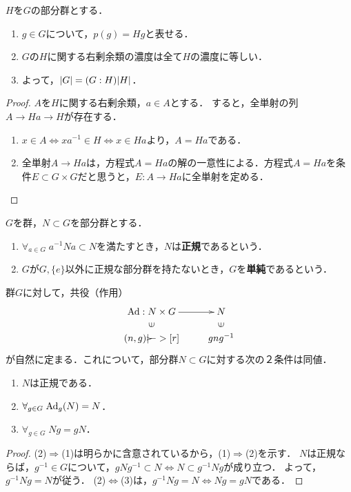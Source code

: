 \documentclass[uplatex,dvipdfmx]{jsreport}
\begin{document}
\begin{proposition}
    $H$を$G$の部分群とする．
    \begin{enumerate}
        \item $g\in G$について，$p(g)=Hg$と表せる．
        \item $G$の$H$に関する右剰余類の濃度は全て$H$の濃度に等しい．
        \item よって，$\lvert G\rvert=(G:H)\lvert H\rvert$．
    \end{enumerate}
\end{proposition}
\begin{proof}
    $A$を$H$に関する右剰余類，$a\in A$とする．
    すると，全単射の列$A\to Ha\to H$が存在する．
    \begin{enumerate}
        \item $x\in A\Leftrightarrow xa^{-1}\in H\Leftrightarrow x\in Ha$より，$A=Ha$である．
        \item 全単射$A\to Ha$は，方程式$A=Ha$の解の一意性による．方程式$A=Ha$を条件$E\subset G\times G$だと思うと，$E:A\to Ha$に全単射を定める．
    \end{enumerate}
\end{proof}

\begin{definition}
    $G$を群，$N\subset G$を部分群とする．
    \begin{enumerate}
        \item $\forall_{a\in G}\; a^{-1}Na\subset N$を満たすとき，$N$は\textbf{正規}であるという．
        \item $G$が$G,\{e\}$以外に正規な部分群を持たないとき，$G$を\textbf{単純}であるという．
    \end{enumerate}
\end{definition}

\begin{proposition}[正規部分群の特徴付け]
    群$G$に対して，共役（作用）
    \[\xymatrix@R-2pc{
        \Ad:N\times G\ar[r]&N\\
        \rotatebox[origin=c]{90}{$\in$}&\rotatebox[origin=c]{90}{$\in$}\\
        (n,g)\ar{|->}[r]&gng^{-1}
    }\]
    が自然に定まる．これについて，部分群$N\subset G$に対する次の２条件は同値．
    \begin{enumerate}
        \item $N$は正規である．
        \item $\forall_{g\in G}\;\mathrm{Ad}_g(N)=N$．
        \item $\forall_{g\in G}\;Ng=gN$．
    \end{enumerate}
\end{proposition}
\begin{proof}
    (2)$\Rightarrow$(1)は明らかに含意されているから，(1)$\Rightarrow$(2)を示す．
    $N$は正規ならば，$g^{-1}\in G$について，$gNg^{-1}\subset N\Leftrightarrow N\subset g^{-1}Ng$が成り立つ．
    よって，$g^{-1}Ng=N$が従う．
    (2)$\Leftrightarrow$(3)は，$g^{-1}Ng=N\Leftrightarrow Ng=gN$である．
\end{proof}
\end{document}
